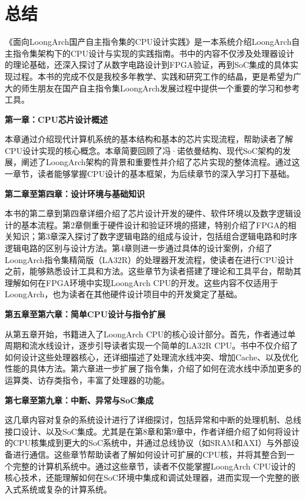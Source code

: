 
\chapter*{总结}\label{chap:19-conclusion}


《面向LoongArch国产自主指令集的CPU设计实践》是一本系统介绍LoongArch自主指令集架构下的CPU设计与实现的实践指南。书中的内容不仅涉及处理器设计的理论基础，还深入探讨了从数字电路设计到FPGA验证，再到SoC集成的具体实现过程。本书的完成不仅是我校多年教学、实践和研究工作的结晶，更是希望为广大的师生朋友在国产自主指令集LoongArch发展过程中提供一个重要的学习和参考工具。

\textbf{第一章：CPU芯片设计概述}

本章通过介绍现代计算机系统的基本结构和基本的芯片实现流程，帮助读者了解CPU设计实现的核心概念。本章简要回顾了冯·诺依曼结构、现代SoC架构的发展，阐述了LoongArch架构的背景和重要性并介绍了芯片实现的整体流程。通过这一章节，读者能够掌握CPU设计的基本框架，为后续章节的深入学习打下基础。

\textbf{第二章至第四章：设计环境与基础知识}

本书的第二章到第四章详细介绍了芯片设计开发的硬件、软件环境以及数字逻辑设计的基本流程。第2章侧重于硬件设计和验证环境的搭建，特别介绍了FPGA的相关知识；第3章深入探讨了数字逻辑电路的组成与设计，包括组合逻辑电路和时序逻辑电路的区别与设计方法。第4章则进一步通过具体的设计案例，介绍了LoongArch指令集精简版（LA32R）的处理器开发流程，使读者在进行CPU设计之前，能够熟悉设计工具和方法。这些章节为读者搭建了理论和工具平台，帮助其理解如何在FPGA环境中实现LoongArch CPU的开发。这些内容不仅适用于LoongArch，也为读者在其他硬件设计项目中的开发奠定了基础。

\textbf{第五章至第六章：简单CPU设计与指令扩展}

从第五章开始，书籍进入了LoongArch CPU的核心设计部分。首先，作者通过单周期和流水线设计，逐步引导读者实现一个简单的LA32R CPU。书中不仅介绍了如何设计这些处理器核心，还详细描述了处理流水线冲突、增加Cache、以及优化性能的具体方法。第六章进一步扩展了指令集，介绍了如何在流水线中添加更多的运算类、访存类指令，丰富了处理器的功能。

\textbf{第七章至第九章：中断、异常与SoC集成}

这几章内容对复杂的系统设计进行了详细探讨，包括异常和中断的处理机制、总线接口设计、以及SoC集成。尤其是在第8章和第9章中，作者详细介绍了如何将设计的CPU核集成到更大的SoC系统中，并通过总线协议（如SRAM和AXI）与外部设备进行通信。这些章节帮助读者了解如何设计可扩展的CPU核，并将其整合到一个完整的计算机系统中。通过这些章节，读者不仅能掌握LoongArch CPU设计的核心技术，还能理解如何在SoC环境中集成和调试处理器，进而实现一个完整的嵌入式系统或复杂的计算系统。

